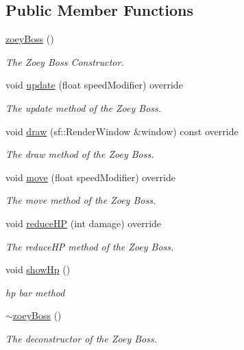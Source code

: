 \subsection*{Public Member Functions}
\begin{DoxyCompactItemize}
\item 
\hyperlink{classzoey_boss_ab5f6f2c7b863fc5e0e887884a50c625e}{zoey\+Boss} ()
\begin{DoxyCompactList}\small\item\em The Zoey Boss Constructor. \end{DoxyCompactList}\item 
void \hyperlink{classzoey_boss_aa712b8f9050e3851cb0133927acd3f54}{update} (float speed\+Modifier) override
\begin{DoxyCompactList}\small\item\em The update method of the Zoey Boss. \end{DoxyCompactList}\item 
void \hyperlink{classzoey_boss_afbf4886e5a325c17a0366b631d274e19}{draw} (sf\+::\+Render\+Window \&window) const override
\begin{DoxyCompactList}\small\item\em The draw method of the Zoey Boss. \end{DoxyCompactList}\item 
void \hyperlink{classzoey_boss_a6c371465ec647b81299a0ffebaa8ee4c}{move} (float speed\+Modifier) override
\begin{DoxyCompactList}\small\item\em The move method of the Zoey Boss. \end{DoxyCompactList}\item 
void \hyperlink{classzoey_boss_a19ddca3c55bb7b4b21aef462bd5d814c}{reduce\+H\+P} (int damage) override
\begin{DoxyCompactList}\small\item\em The reduce\+H\+P method of the Zoey Boss. \end{DoxyCompactList}\item 
void \hyperlink{classzoey_boss_ae70c0773e30ab34f2c12ca816eb582cd}{show\+Hp} ()
\begin{DoxyCompactList}\small\item\em hp bar method \end{DoxyCompactList}\item 
\hyperlink{classzoey_boss_a17ba0c048af2ae5347f79944a623aecd}{$\sim$zoey\+Boss} ()
\begin{DoxyCompactList}\small\item\em The deconstructor of the Zoey Boss. \end{DoxyCompactList}\end{DoxyCompactItemize}

